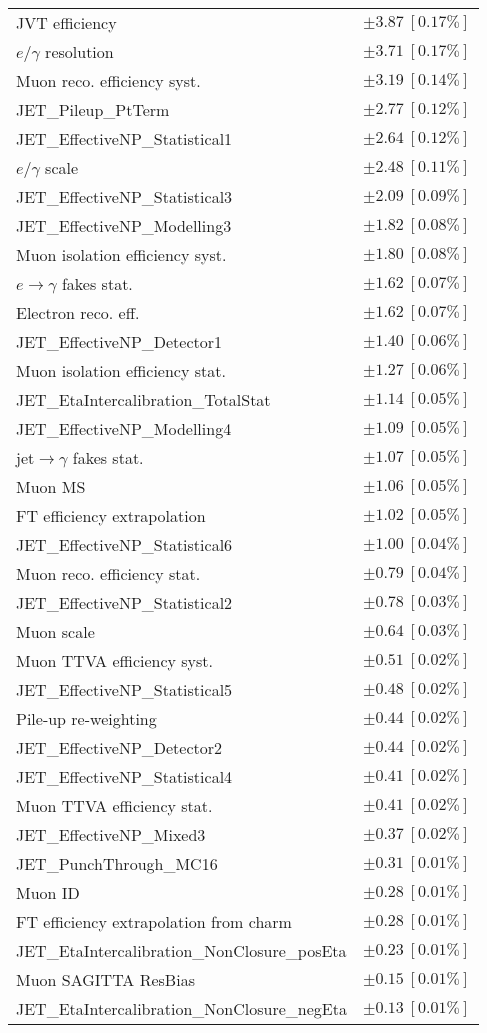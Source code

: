 \begin{tabular}{lr}
JVT efficiency & $\pm 3.87\ [0.17\%]$ \\
$e/\gamma$ resolution & $\pm 3.71\ [0.17\%]$ \\
Muon reco. efficiency syst. & $\pm 3.19\ [0.14\%]$ \\
JET\_Pileup\_PtTerm & $\pm 2.77\ [0.12\%]$ \\
JET\_EffectiveNP\_Statistical1 & $\pm 2.64\ [0.12\%]$ \\
$e/\gamma$ scale & $\pm 2.48\ [0.11\%]$ \\
JET\_EffectiveNP\_Statistical3 & $\pm 2.09\ [0.09\%]$ \\
JET\_EffectiveNP\_Modelling3 & $\pm 1.82\ [0.08\%]$ \\
Muon isolation efficiency syst. & $\pm 1.80\ [0.08\%]$ \\
$e\to\gamma$ fakes stat. & $\pm 1.62\ [0.07\%]$ \\
Electron reco. eff. & $\pm 1.62\ [0.07\%]$ \\
JET\_EffectiveNP\_Detector1 & $\pm 1.40\ [0.06\%]$ \\
Muon isolation efficiency stat. & $\pm 1.27\ [0.06\%]$ \\
JET\_EtaIntercalibration\_TotalStat & $\pm 1.14\ [0.05\%]$ \\
JET\_EffectiveNP\_Modelling4 & $\pm 1.09\ [0.05\%]$ \\
jet$\to\gamma$ fakes stat. & $\pm 1.07\ [0.05\%]$ \\
Muon MS & $\pm 1.06\ [0.05\%]$ \\
FT efficiency extrapolation & $\pm 1.02\ [0.05\%]$ \\
JET\_EffectiveNP\_Statistical6 & $\pm 1.00\ [0.04\%]$ \\
Muon reco. efficiency stat. & $\pm 0.79\ [0.04\%]$ \\
JET\_EffectiveNP\_Statistical2 & $\pm 0.78\ [0.03\%]$ \\
Muon scale & $\pm 0.64\ [0.03\%]$ \\
Muon TTVA efficiency syst. & $\pm 0.51\ [0.02\%]$ \\
JET\_EffectiveNP\_Statistical5 & $\pm 0.48\ [0.02\%]$ \\
Pile-up re-weighting & $\pm 0.44\ [0.02\%]$ \\
JET\_EffectiveNP\_Detector2 & $\pm 0.44\ [0.02\%]$ \\
JET\_EffectiveNP\_Statistical4 & $\pm 0.41\ [0.02\%]$ \\
Muon TTVA efficiency stat. & $\pm 0.41\ [0.02\%]$ \\
JET\_EffectiveNP\_Mixed3 & $\pm 0.37\ [0.02\%]$ \\
JET\_PunchThrough\_MC16 & $\pm 0.31\ [0.01\%]$ \\
Muon ID & $\pm 0.28\ [0.01\%]$ \\
FT efficiency extrapolation from charm & $\pm 0.28\ [0.01\%]$ \\
JET\_EtaIntercalibration\_NonClosure\_posEta & $\pm 0.23\ [0.01\%]$ \\
Muon SAGITTA ResBias & $\pm 0.15\ [0.01\%]$ \\
JET\_EtaIntercalibration\_NonClosure\_negEta & $\pm 0.13\ [0.01\%]$ \\
\hline
\end{tabular}
